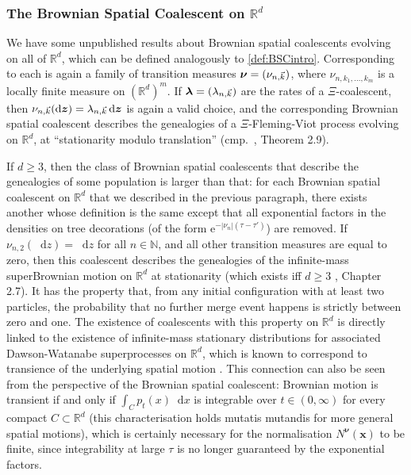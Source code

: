 \documentclass[reqno,draft]{amsart}
\numberwithin{equation}{section}
\theoremstyle{plain}
\theoremstyle{remark}
\newcommand{\R}{\mathbb{R}} %
\newcommand{\N}{\mathbb{N}} %
\newcommand*\diff{\mathop{}\!\mathrm{d}}
\newcommand{\e}{\mathrm{e}}
\newcommand{\nut}[1]{|\nu_{#1}|}
\newcommand{\nunk}{\nu_{n,\smash{\vec{k}}}}
\newcommand{\lank}{\lambda_{n,\smash{\vec{k}}}}
\begin{document}
\subsubsection{The Brownian Spatial Coalescent on $\R^d$}
We have some unpublished results about Brownian spatial coalescents evolving on all of $\R^d$, which can be defined analogously to \cref{def:BSCintro}. Corresponding to each is again a family of transition measures $\boldsymbol \nu = (\nunk)$, where $\nu_{n,k_1, \ldots ,k_m}$ is a locally finite measure on $(\R^d)^m$. If $\boldsymbol \lambda = (\lank)$ are the rates of a $\Xi$-coalescent, then $\nunk(\diff \boldsymbol z) = \lank \diff \boldsymbol z$ is again a valid choice, and the corresponding Brownian spatial coalescent describes the genealogies of a $\Xi$-Fleming-Viot process evolving on $\R^d$, at ``stationarity modulo translation'' (cmp.\ \cite{DK96}, Theorem 2.9).

If $d \ge 3$, then the class of Brownian spatial coalescents that describe the genealogies of some population is larger than that: for each Brownian spatial coalescent on $\R^d$ that we described in the previous paragraph, there exists another whose definition is the same except that all exponential factors in the densities on tree decorations (of the form $\e^{-\nut{n}(\tau - \tau')}$) are removed.
If $\nu_{n,2}(\diff z) = \diff z$ for all $n\in \N$, and all other transition measures are equal to zero, then this coalescent describes the genealogies of the infinite-mass superBrownian motion on $\R^d$ at stationarity (which exists iff $d \ge 3$ \cite{etheridgesuperprocesses}, Chapter 2.7). It has the property that, from any initial configuration with at least two particles, the probability that no further merge event happens is strictly between zero and one. The existence of coalescents with this property on $\R^d$ is directly linked to the existence of infinite-mass stationary distributions for associated Dawson-Watanabe superprocesses on $\R^d$, which is known to correspond to transience of the underlying spatial motion \cite{transient1,transient2}. This connection can also be seen from the perspective of the Brownian spatial coalescent: Brownian motion is transient if and only if $\int_C p_t(x) \diff x$ is integrable over $t\in (0,\infty)$ for every compact $C \subset \R^d$ (this characterisation holds mutatis mutandis for more general spatial motions), which is certainly necessary for the normalisation $N^{\boldsymbol \nu}(\boldsymbol x)$ to be finite, since integrability at large $\tau$ is no longer guaranteed by the exponential factors.
\end{document}

